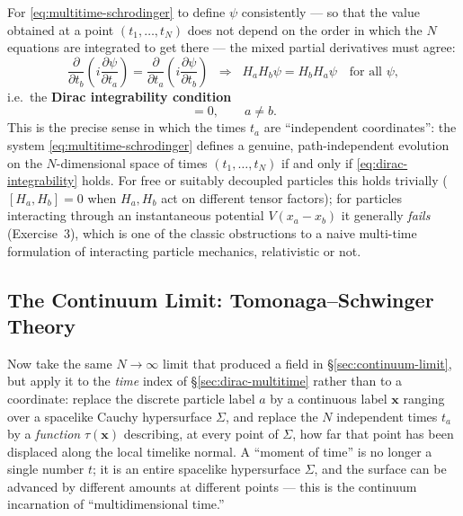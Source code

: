 \documentclass[11pt]{book}
\newcommand{\pdv}[2]{\dfrac{\partial #1}{\partial #2}}
\theoremstyle{definition}
\theoremstyle{remark}
\begin{document}
For \eqref{eq:multitime-schrodinger} to define $\psi$ consistently --- so that the value obtained at a point $(t_1,\dots,t_N)$ does not depend on the order in which the $N$ equations are integrated to get there --- the mixed partial derivatives must agree:
\begin{equation}
\pdv{}{t_b}\left(i\pdv{\psi}{t_a}\right) = \pdv{}{t_a}\left(i\pdv{\psi}{t_b}\right)
\;\;\Longrightarrow\;\;
H_aH_b\psi = H_bH_a\psi \quad \text{for all }\psi,
\end{equation}
i.e.\ the \textbf{Dirac integrability condition}
\begin{equation}
[H_a,H_b]=0, \qquad a\neq b.
\label{eq:dirac-integrability}
\end{equation}
This is the precise sense in which the times $t_a$ are ``independent coordinates'': the system \eqref{eq:multitime-schrodinger} defines a genuine, path-independent evolution on the $N$-dimensional space of times $(t_1,\dots,t_N)$ if and only if \eqref{eq:dirac-integrability} holds. For free or suitably decoupled particles this holds trivially ($[H_a,H_b]=0$ when $H_a,H_b$ act on different tensor factors); for particles interacting through an instantaneous potential $V(x_a-x_b)$ it generally \emph{fails} (Exercise~3), which is one of the classic obstructions to a naive multi-time formulation of interacting particle mechanics, relativistic or not.

\subsection{The Continuum Limit: Tomonaga--Schwinger Theory}
\label{sec:tomonaga-schwinger}

Now take the same $N\to\infty$ limit that produced a field in \S\ref{sec:continuum-limit}, but apply it to the \emph{time} index of \S\ref{sec:dirac-multitime} rather than to a coordinate: replace the discrete particle label $a$ by a continuous label $\mathbf{x}$ ranging over a spacelike Cauchy hypersurface $\Sigma$, and replace the $N$ independent times $t_a$ by a \emph{function} $\tau(\mathbf{x})$ describing, at every point of $\Sigma$, how far that point has been displaced along the local timelike normal. A ``moment of time'' is no longer a single number $t$; it is an entire spacelike hypersurface $\Sigma$, and the surface can be advanced by different amounts at different points --- this is the continuum incarnation of ``multidimensional time.''
\end{document}
